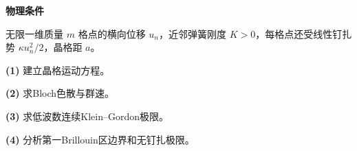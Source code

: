 \textbf{物理条件}\par 无限一维质量 \(m\) 格点的横向位移 \(u_n\)，近邻弹簧刚度 \(K>0\)，每格点还受线性钉扎势 \(\kappa u_n^2/2\)，晶格距 \(a\)。
\par\noindent\textbf{(1)} 建立晶格运动方程。
\par\noindent\textbf{(2)} 求Bloch色散与群速。
\par\noindent\textbf{(3)} 求低波数连续Klein–Gordon极限。
\par\noindent\textbf{(4)} 分析第一Brillouin区边界和无钉扎极限。
